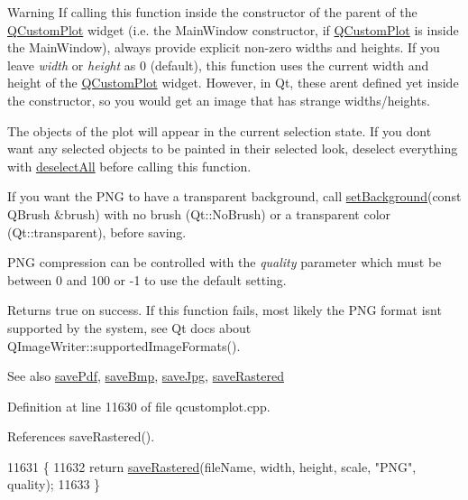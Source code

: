 \begin{DoxyWarning}{Warning}
If calling this function inside the constructor of the parent of the \hyperlink{class_q_custom_plot}{Q\+Custom\+Plot} widget (i.\+e. the Main\+Window constructor, if \hyperlink{class_q_custom_plot}{Q\+Custom\+Plot} is inside the Main\+Window), always provide explicit non-\/zero widths and heights. If you leave {\itshape width} or {\itshape height} as 0 (default), this function uses the current width and height of the \hyperlink{class_q_custom_plot}{Q\+Custom\+Plot} widget. However, in Qt, these aren\textquotesingle{}t defined yet inside the constructor, so you would get an image that has strange widths/heights.
\end{DoxyWarning}
The objects of the plot will appear in the current selection state. If you don\textquotesingle{}t want any selected objects to be painted in their selected look, deselect everything with \hyperlink{class_q_custom_plot_a9d4808ab925b003054085246c92a257c}{deselect\+All} before calling this function.

If you want the P\+N\+G to have a transparent background, call \hyperlink{class_q_custom_plot_a130358592cfca353ff3cf5571b49fb00}{set\+Background}(const Q\+Brush \&brush) with no brush (Qt\+::\+No\+Brush) or a transparent color (Qt\+::transparent), before saving.

P\+N\+G compression can be controlled with the {\itshape quality} parameter which must be between 0 and 100 or -\/1 to use the default setting.

Returns true on success. If this function fails, most likely the P\+N\+G format isn\textquotesingle{}t supported by the system, see Qt docs about Q\+Image\+Writer\+::supported\+Image\+Formats().

\begin{DoxySeeAlso}{See also}
\hyperlink{class_q_custom_plot_a632da44c6d94ea8b271eb483b08b5114}{save\+Pdf}, \hyperlink{class_q_custom_plot_a6629d9e8e6da4bf18055ee0257fdce9a}{save\+Bmp}, \hyperlink{class_q_custom_plot_a490c722092d1771e8ce4a7a73dfd84ab}{save\+Jpg}, \hyperlink{class_q_custom_plot_ab528b84cf92baabe29b1d0ef2f77c93e}{save\+Rastered} 
\end{DoxySeeAlso}


Definition at line 11630 of file qcustomplot.\+cpp.



References save\+Rastered().


\begin{DoxyCode}
11631                                                      \{
11632   \textcolor{keywordflow}{return} \hyperlink{class_q_custom_plot_ab528b84cf92baabe29b1d0ef2f77c93e}{saveRastered}(fileName, width, height, scale, \textcolor{stringliteral}{"PNG"}, quality);
11633 \}
\end{DoxyCode}



